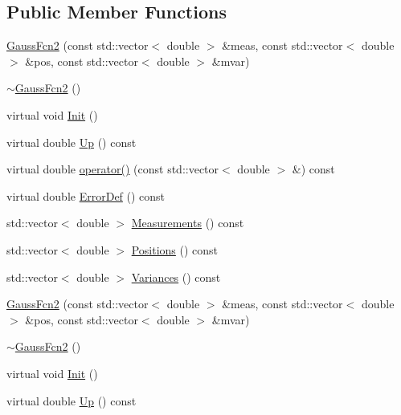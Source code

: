 \subsection*{Public Member Functions}
\begin{DoxyCompactItemize}
\item 
\mbox{\hyperlink{classROOT_1_1Minuit2_1_1GaussFcn2_a2904a79650d89e25591d84060e986271}{Gauss\+Fcn2}} (const std\+::vector$<$ double $>$ \&meas, const std\+::vector$<$ double $>$ \&pos, const std\+::vector$<$ double $>$ \&mvar)
\item 
\mbox{\hyperlink{classROOT_1_1Minuit2_1_1GaussFcn2_ab37a15b9986eab678018570c2a744799}{$\sim$\+Gauss\+Fcn2}} ()
\item 
virtual void \mbox{\hyperlink{classROOT_1_1Minuit2_1_1GaussFcn2_a4094daab77c76f30bacb299c5c3dfba4}{Init}} ()
\item 
virtual double \mbox{\hyperlink{classROOT_1_1Minuit2_1_1GaussFcn2_aef7172f9af50244bc9fce0c96cc21e81}{Up}} () const
\item 
virtual double \mbox{\hyperlink{classROOT_1_1Minuit2_1_1GaussFcn2_ad90e2fe9c9a2392c1e110a3e4679bfc3}{operator()}} (const std\+::vector$<$ double $>$ \&) const
\item 
virtual double \mbox{\hyperlink{classROOT_1_1Minuit2_1_1GaussFcn2_ac240f7b6ecbb7bf842d786e3914c620a}{Error\+Def}} () const
\item 
std\+::vector$<$ double $>$ \mbox{\hyperlink{classROOT_1_1Minuit2_1_1GaussFcn2_acd862030b2db540b0a7210e78c2f913f}{Measurements}} () const
\item 
std\+::vector$<$ double $>$ \mbox{\hyperlink{classROOT_1_1Minuit2_1_1GaussFcn2_a11faaa08de303ea203403c320c9e1f0a}{Positions}} () const
\item 
std\+::vector$<$ double $>$ \mbox{\hyperlink{classROOT_1_1Minuit2_1_1GaussFcn2_ae14a0349f83e8ffe7b2b1cda4e138113}{Variances}} () const
\item 
\mbox{\hyperlink{classROOT_1_1Minuit2_1_1GaussFcn2_a2904a79650d89e25591d84060e986271}{Gauss\+Fcn2}} (const std\+::vector$<$ double $>$ \&meas, const std\+::vector$<$ double $>$ \&pos, const std\+::vector$<$ double $>$ \&mvar)
\item 
\mbox{\hyperlink{classROOT_1_1Minuit2_1_1GaussFcn2_ab37a15b9986eab678018570c2a744799}{$\sim$\+Gauss\+Fcn2}} ()
\item 
virtual void \mbox{\hyperlink{classROOT_1_1Minuit2_1_1GaussFcn2_a6bebb2531692e8896a7ec3b93f1c0776}{Init}} ()
\item 
virtual double \mbox{\hyperlink{classROOT_1_1Minuit2_1_1GaussFcn2_aef7172f9af50244bc9fce0c96cc21e81}{Up}} () const

\end{DoxyCompactItemize}
